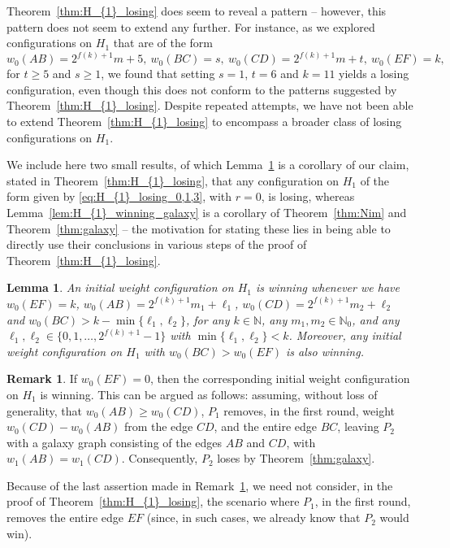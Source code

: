 \documentclass[11pt,reqno]{amsart}
\newtheorem{lemma}[theorem]{Lemma}
\theoremstyle{definition}
\theoremstyle{definition}
\newtheorem{remark}[theorem]{Remark}
\begin{document}
Theorem~\ref{thm:H_{1}_losing} does seem to reveal a pattern -- however, this pattern does not seem to extend any further. For instance, as we explored configurations on $H_{1}$ that are of the form
\begin{equation}
w_{0}(AB)=2^{f(k)+1}m+5,\ w_{0}(BC)=s,\ w_{0}(CD)=2^{f(k)+1}m+t,\ w_{0}(EF)=k,\nonumber
\end{equation}
for $t\geqslant 5$ and $s\geqslant 1$, we found that setting $s=1$, $t=6$ and $k=11$ yields a losing configuration, even though this does not conform to the patterns suggested by Theorem~\ref{thm:H_{1}_losing}. Despite repeated attempts, we have not been able to extend Theorem~\ref{thm:H_{1}_losing} to encompass a broader class of losing configurations on $H_{1}$.

We include here two small results, of which Lemma~\ref{lem:H_{1}_winning_2} is a corollary of our claim, stated in Theorem~\ref{thm:H_{1}_losing}, that any configuration on $H_{1}$ of the form given by \eqref{eq:H_{1}_losing_0,1,3}, with $r=0$, is losing, whereas Lemma~\ref{lem:H_{1}_winning_galaxy} is a corollary of Theorem~\ref{thm:Nim} and Theorem~\ref{thm:galaxy} -- the motivation for stating these lies in being able to directly use their conclusions in various steps of the proof of Theorem~\ref{thm:H_{1}_losing}.
\begin{lemma}\label{lem:H_{1}_winning_2}
An initial weight configuration on $H_{1}$ is winning whenever we have $w_{0}(EF)=k$, $w_{0}(AB)=2^{f(k)+1}m_{1}+\ell_{1}$, $w_{0}(CD)=2^{f(k)+1}m_{2}+\ell_{2}$ and $w_{0}(BC)>k-\min\{\ell_{1},\ell_{2}\}$, for any $k \in \mathbb{N}$, any $m_{1}, m_{2} \in \mathbb{N}_{0}$, and any $\ell_{1}, \ell_{2} \in \{0,1,\ldots,2^{f(k)+1}-1\}$ with $\min\{\ell_{1},\ell_{2}\}<k$. Moreover, any initial weight configuration on $H_{1}$ with $w_{0}(BC)>w_{0}(EF)$ is also winning. 
\end{lemma}
\begin{remark}\label{rem:EF_edgeweight_0}
If $w_{0}(EF)=0$, then the corresponding initial weight configuration on $H_{1}$ is winning. This can be argued as follows: assuming, without loss of generality, that $w_{0}(AB)\geqslant w_{0}(CD)$, $P_{1}$ removes, in the first round, weight $w_{0}(CD)-w_{0}(AB)$ from the edge $CD$, and the entire edge $BC$, leaving $P_{2}$ with a galaxy graph consisting of the edges $AB$ and $CD$, with $w_{1}(AB)=w_{1}(CD)$. Consequently, $P_{2}$ loses by Theorem~\ref{thm:galaxy}.
\end{remark}
Because of the last assertion made in Remark~\ref{rem:EF_edgeweight_0}, we need not consider, in the proof of Theorem~\ref{thm:H_{1}_losing}, the scenario where $P_{1}$, in the first round, removes the entire edge $EF$ (since, in such cases, we already know that $P_{2}$ would win).
\end{document}
